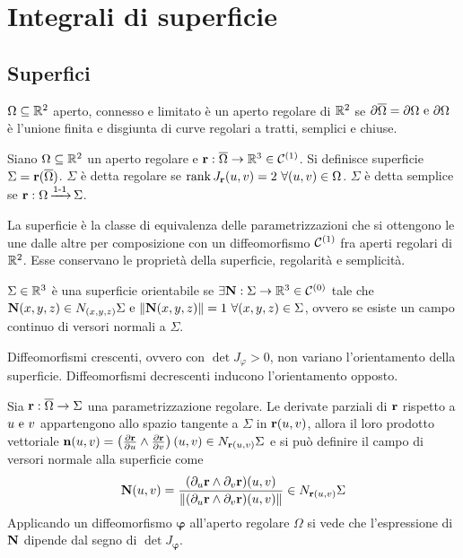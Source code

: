 \chapter{Integrali di superficie}

\section{Superfici}

\begin{definition}
	$\Omega \subseteq \mathbb{R}^2$ aperto, connesso e limitato è un aperto regolare di $\mathbb{R}^2$ se $\partial \overline{\Omega}=\partial \Omega \text{ e } \partial \Omega$ è l'unione finita e disgiunta di curve regolari a tratti, semplici e chiuse.
\end{definition}

\begin{definition}
	[Superficie]
	Siano $\Omega \subseteq \mathbb{R}^2$ un aperto regolare e $\vb{r}:\overline{\Omega}\to \mathbb{R}^3 \in \mathcal{C}^{(1)}$. Si definisce superficie $\Sigma=\vb{r}(\overline{\Omega})$.
	$\Sigma$ è detta regolare se $\rank{J_{\vb{r}}(u,v)} = 2 \ \forall (u,v) \in \Omega$.
	$\Sigma$ è detta semplice se $\vb{r}:\Omega \operatorname{\xrightarrow{\operatorname{1-1}}} \Sigma$.
\end{definition}

\begin{remark}
	La superficie è la classe di equivalenza delle parametrizzazioni che si ottengono le une dalle altre per composizione con un diffeomorfismo $\mathcal{C}^{(1)}$ fra aperti regolari di $\mathbb{R}^2$. Esse conservano le proprietà della superficie, regolarità e semplicità.
\end{remark}

\begin{definition}
	$\Sigma \in \mathbb{R}^3$ è una superficie orientabile se $\exists \vb{N}:\Sigma \to \mathbb{R}^3 \in \mathcal{C}^{(0)}$ tale che $\vb{N}(x,y,z)\in N_{(x,y,z)}\Sigma \text{ e } \norm{\vb{N}(x,y,z)}=1 \ \forall (x,y,z) \in \Sigma$, ovvero se esiste un campo continuo di versori normali a $\Sigma$.
\end{definition}

\begin{remark}
	Diffeomorfismi crescenti, ovvero con $\det J_\varphi>0$, non variano l'orientamento della superficie. Diffeomorfismi decrescenti inducono l'orientamento opposto.
\end{remark}

Sia $\vb{r}:\overline{\Omega} \to \Sigma$ una parametrizzazione regolare. Le derivate parziali di $\vb{r}$ rispetto a $u \text{ e } v$ appartengono allo spazio tangente a $\Sigma$ in $\vb{r}(u,v)$, allora il loro prodotto vettoriale $\vb{n}(u,v)=\left(\frac{\partial \vb{r}}{\partial u}\wedge\frac{\partial \vb{r}}{\partial v}\right)(u,v) \in N_{\vb{r}(u,v)}\Sigma$ e si può definire il campo di versori normale alla superficie come
$$
	\vb{N}(u,v)=\frac{(\partial_u\vb{r}\wedge\partial_v\vb{r})(u,v)}{\norm{(\partial_u\vb{r}\wedge\partial_v\vb{r})(u,v)}}\in N_{\vb{r}(u,v)}\Sigma
$$
Applicando un diffeomorfismo $\bm\varphi$ all'aperto regolare $\Omega$ si vede che l'espressione di $\vb{N}$ dipende dal segno di $\det J_{\bm\varphi}$.

